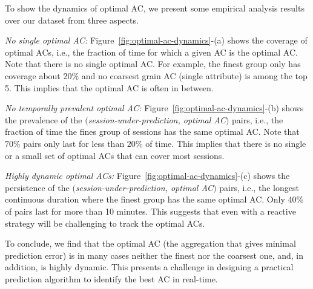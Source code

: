 To show the dynamics of optimal AC, we present some empirical analysis results over our dataset from three aspects. 
 
\begin{packeditemize}
	\item {\it No single optimal AC:} Figure~\ref{fig:optimal-ac-dynamics}-(a) shows the coverage of optimal ACs, i.e., the fraction of time for which a given AC is the optimal AC. Note that there is no single optimal AC. For example, the finest group only has coverage about 20\% and no coarsest grain AC (single attribute) is among the top 5. This implies that the optimal AC is often in between.
	\item {\it No temporally prevalent optimal AC:} Figure~\ref{fig:optimal-ac-dynamics}-(b) shows the prevalence of the $($\emph{session-under-prediction, optimal AC}$)$ pairs, i.e., the fraction of time the fines group of sessions has the same optimal AC. Note that $70\%$ pairs only last for less than $20\%$ of time. This implies that there is no single or a small set of optimal ACs that can cover most sessions.
	\item {\it Highly dynamic optimal ACs:} Figure~\ref{fig:optimal-ac-dynamics}-(c) shows the persistence of the $($\emph{session-under-prediction, optimal AC}$)$ pairs, i.e., the longest continuous duration where the finest group has the same optimal AC. Only 40\% of pairs last for more than 10 minutes. This suggests that even with a reactive strategy will be challenging to track the optimal ACs.
\end{packeditemize}

To conclude, we find that the optimal AC (the aggregation that gives minimal prediction error) is in many cases neither the finest nor the coarsest one, and, in addition, is highly dynamic. This presents a challenge in designing a practical prediction algorithm to identify the best AC in real-time.

